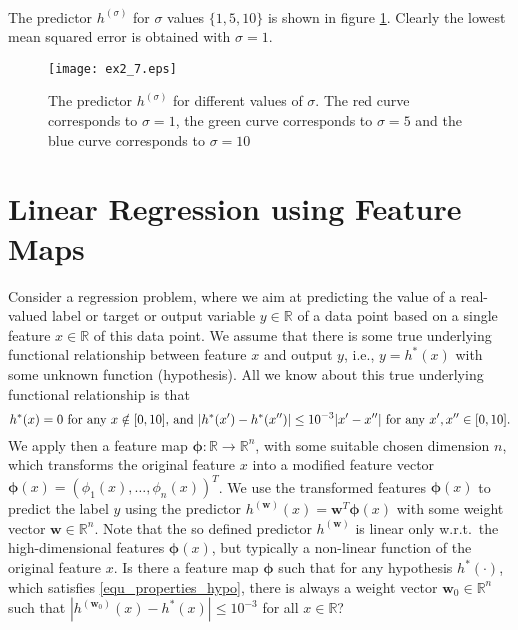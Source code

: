 \documentclass[article,11pt]{article}
\begin{document}
\\
The predictor $h^{(\sigma)}$ for $\sigma$ values $\{1,5,10\}$ is shown in figure
\ref{fig:kernelregression}. Clearly the lowest mean squared error is obtained
with $\sigma=1$.
\begin{figure}[!h]
  \centering
  \texttt{[image: ex2\_7.eps]}
  \caption{The predictor $h^{(\sigma)}$ for different values of $\sigma$. The red
    curve corresponds to $\sigma=1$, the green curve corresponds to
    $\sigma=5$ and the blue curve corresponds to $\sigma=10$}
  \label{fig:kernelregression}
\end{figure}

\newpage
\section{Linear Regression using Feature Maps}
Consider a regression problem, where we aim at predicting the value of a real-valued label or target or output variable $y \in \mathbb{R}$ of a data point 
based on a single feature $x \in \mathbb{R}$ of this data point. We assume that there is some true underlying functional relationship between 
feature $x$ and output $y$, i.e., $y =h^{*}(x)$ with some unknown function (hypothesis). All we know about this true underlying functional relationship is 
that 
\vspace*{-2mm}
\begin{equation}
\label{equ_properties_hypo}
h^{*}(x) = 0 \mbox{ for any } x \notin [0,10]  \mbox{, and } |h^{*}(x') -h^{*}(x'')| \leq 10^{-3} |x'-x''| \mbox{ for any } x',x'' \in[0,10]. 
\vspace*{-2mm}
\end{equation}
We apply then a feature map ${\bm \phi}: \mathbb{R} \rightarrow \mathbb{R}^{n}$, with some suitable chosen dimension $n$, which transforms 
the original feature $x$ into a modified feature vector ${\bm \phi}(x)=(\phi_{1}(x),\ldots,\phi_{n}(x))^{T}$. We use the transformed features 
${\bm \phi}(x)$ to predict the label $y$ using the predictor $h^{(\mathbf{w})}(x) = \mathbf{w}^{T} {\bm \phi}(x)$ with some weight vector $\mathbf{w}\in \mathbb{R}^{n}$. 
Note that the so defined predictor $h^{(\mathbf{w})}$ is linear only w.r.t.\ the high-dimensional features ${\bm \phi}(x)$, but typically 
a non-linear function of the original feature $x$. Is there a feature map ${\bm \phi}$ such that for any hypothesis $h^{*}(\cdot)$, which satisfies \eqref{equ_properties_hypo}, 
there is always a weight vector $\mathbf{w}_{0} \in \mathbb{R}^{n}$ such that $|h^{(\mathbf{w}_{0})}(x) - h^{*}(x)| \leq 10^{-3}$ for all $x \in \mathbb{R}$?\\
\end{document}
